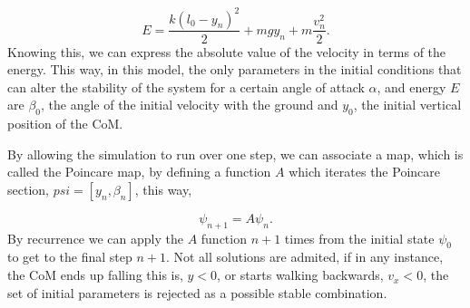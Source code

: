 \begin{equation}
  E=\frac{k (l_0-y_n)^2}{2} + m g y_n + m \frac{v_n^2}{2}.
\end{equation}
\noindent Knowing this, we can express the absolute value of the velocity in terms of the energy. This way, in this model, the only parameters in the initial conditions that can alter the stability of the system for a certain angle of attack $\alpha$, and energy $E$ are $\beta_0$, the angle of the initial velocity with the ground and $y_0$, the initial vertical position of the CoM.

By allowing the simulation to run over one step, we can associate a map, which is called the Poincare map, by defining a function $A$ which iterates the Poincare section, $psi=[y_n,\beta_n]$, this way,

\begin{equation}
  \psi_{n+1}=A \psi_n.
\end{equation}
By recurrence we can apply the $A$ function $n+1$ times from the initial state $\psi_0$ to get to the final step $n+1$.
Not all solutions are admited, if in any instance, the CoM ends up falling this is, $y<0$, or starts walking backwards, $v_x<0$, the set of initial parameters is rejected as a possible stable combination.







